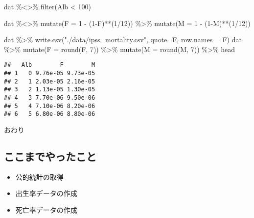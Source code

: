 \documentclass[
]{book}
\newenvironment{Shaded}{\begin{snugshade}}{\end{snugshade}}
\newcommand{\AttributeTok}[1]{\textcolor[rgb]{0.77,0.63,0.00}{#1}}
\newcommand{\DecValTok}[1]{\textcolor[rgb]{0.00,0.00,0.81}{#1}}
\newcommand{\FunctionTok}[1]{\textcolor[rgb]{0.00,0.00,0.00}{#1}}
\newcommand{\NormalTok}[1]{#1}
\newcommand{\SpecialCharTok}[1]{\textcolor[rgb]{0.00,0.00,0.00}{#1}}
\newcommand{\StringTok}[1]{\textcolor[rgb]{0.31,0.60,0.02}{#1}}
\providecommand{\tightlist}{%
  \setlength{\itemsep}{0pt}\setlength{\parskip}{0pt}}
\begin{document}
\begin{Shaded}
\begin{Highlighting}[]
\NormalTok{dat }\SpecialCharTok{\%\textless{}\textgreater{}\%}
        \FunctionTok{filter}\NormalTok{(Alb }\SpecialCharTok{\textless{}} \DecValTok{100}\NormalTok{)}

\NormalTok{dat }\SpecialCharTok{\%\textless{}\textgreater{}\%} 
        \FunctionTok{mutate}\NormalTok{(}\AttributeTok{F =} \DecValTok{1} \SpecialCharTok{{-}}\NormalTok{ (}\DecValTok{1}\SpecialCharTok{{-}}\NormalTok{F)}\SpecialCharTok{**}\NormalTok{(}\DecValTok{1}\SpecialCharTok{/}\DecValTok{12}\NormalTok{)) }\SpecialCharTok{\%\textgreater{}\%} 
        \FunctionTok{mutate}\NormalTok{(}\AttributeTok{M =} \DecValTok{1} \SpecialCharTok{{-}}\NormalTok{ (}\DecValTok{1}\SpecialCharTok{{-}}\NormalTok{M)}\SpecialCharTok{**}\NormalTok{(}\DecValTok{1}\SpecialCharTok{/}\DecValTok{12}\NormalTok{)) }

\NormalTok{dat }\SpecialCharTok{\%\textgreater{}\%} \FunctionTok{write.csv}\NormalTok{(}\StringTok{"./data/ipss\_mortality.csv"}\NormalTok{, }\AttributeTok{quote=}\NormalTok{F, }\AttributeTok{row.names =}\NormalTok{ F)}
\NormalTok{dat }\SpecialCharTok{\%\textgreater{}\%} 
        \FunctionTok{mutate}\NormalTok{(}\AttributeTok{F =} \FunctionTok{round}\NormalTok{(F, }\DecValTok{7}\NormalTok{)) }\SpecialCharTok{\%\textgreater{}\%} 
        \FunctionTok{mutate}\NormalTok{(}\AttributeTok{M =} \FunctionTok{round}\NormalTok{(M, }\DecValTok{7}\NormalTok{)) }\SpecialCharTok{\%\textgreater{}\%} 
\NormalTok{        head}
\end{Highlighting}
\end{Shaded}

\begin{verbatim}
##   Alb        F        M
## 1   0 9.76e-05 9.73e-05
## 2   1 2.03e-05 2.16e-05
## 3   2 1.13e-05 1.30e-05
## 4   3 7.70e-06 9.50e-06
## 5   4 7.10e-06 8.20e-06
## 6   5 6.80e-06 8.80e-06
\end{verbatim}

おわり

\hypertarget{ux3053ux3053ux307eux3067ux3084ux3063ux305fux3053ux3068}{%
\subsection{ここまでやったこと}\label{ux3053ux3053ux307eux3067ux3084ux3063ux305fux3053ux3068}}

\begin{itemize}
\tightlist
\item
  公的統計の取得
\item
  出生率データの作成
\item
  死亡率データの作成
\end{itemize}
\end{document}
